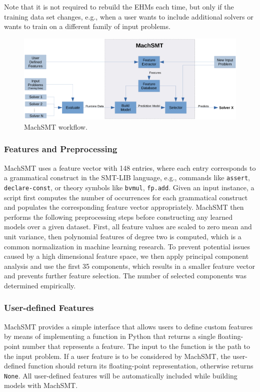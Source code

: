 \documentclass{article}
\begin{document}
Note that it is not required to rebuild the EHMs each time, but only if the
training data set changes, e.g., when a user wants to include additional
solvers or wants to train on a different family of input problems.

\begin{figure}
  \includegraphics[width=\textwidth]{machsmt.png}
  \caption{MachSMT workflow.}
  \label{fig:machsmt}
\end{figure}

\subsubsection{Features and Preprocessing}

MachSMT uses a feature vector with 148 entries, where each entry corresponds to
a grammatical construct in the SMT-LIB language, e.g., commands like
\texttt{assert}, \texttt{declare-const}, or
theory symbols like \texttt{bvmul}, \texttt{fp.add}.
Given an input instance, a script first computes the number of occurrences for
each grammatical construct and populates the corresponding feature vector
appropriately.
MachSMT then performs the following preprocessing steps before constructing any
learned models over a given dataset.
First, all feature values are scaled to zero mean and unit variance, then
polynomial features of degree two is computed, which is a common normalization
in machine learning research.
To prevent potential issues caused by a high dimensional feature space, we then
apply principal component analysis and use the first 35 components, which
results in a smaller feature vector and prevents further feature selection.
The number of selected components was determined empirically.


\subsubsection{User-defined Features}

MachSMT provides a simple interface that allows users to define custom features
by means of implementing a function in Python that returns a single
floating-point number that represents a feature.
The input to the function is the path to the input problem.
If a user feature is to be considered by MachSMT, the user-defined function
should return its floating-point representation, otherwise returns
\texttt{None}.
All user-defined features will be automatically included while building models
with MachSMT.
\end{document}
